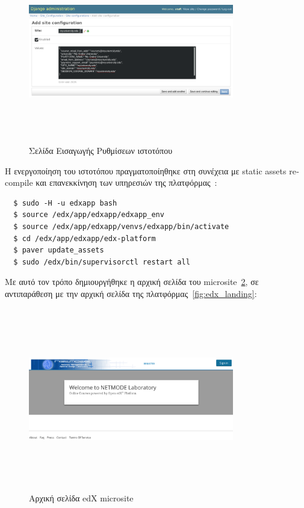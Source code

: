 \documentclass[12pt]{report}
\begin{document}
\begin{figure}[h]
\centering
\includegraphics[width=0.8\textwidth, height=8cm]{django-site-conf}
\caption{Σελίδα Εισαγωγής Ρυθμίσεων ιστοτόπου}
\label{fig:django-site-conf}
\end{figure}

Η ενεργοποίηση του ιστοτόπου πραγματοποίηθηκε στη συνέχεια με \textlatin{static assets recompile} και επανεκκίνηση των υπηρεσιών της πλατφόρμας~\cite{lawrence_mcdaniel_2018}:
\begin{Verbatim}
  $ sudo -H -u edxapp bash
  $ source /edx/app/edxapp/edxapp_env
  $ source /edx/app/edxapp/venvs/edxapp/bin/activate
  $ cd /edx/app/edxapp/edx-platform
  $ paver update_assets
  $ sudo /edx/bin/supervisorctl restart all
\end{Verbatim}
Με αυτό τον τρόπο δημιουργήθηκε η αρχική σελίδα του \textlatin{microsite}~\ref{fig:microsite_landing}, σε αντιπαράθεση με την αρχική σελίδα της πλατφόρμας~\ref{fig:edx_landing}:
\begin{figure}[h]
\centering
\includegraphics[width=0.8\textwidth, height=8cm]{microsite-landing}
\caption{Αρχική σελίδα \textlatin{edX microsite}}
\label{fig:microsite_landing}
\end{figure}
\end{document}
